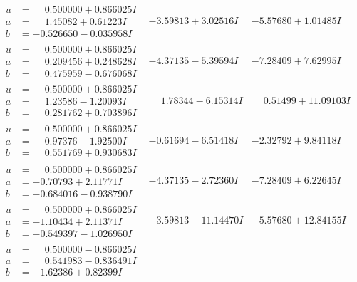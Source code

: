 \documentclass[1p]{elsarticle_modified}
\theoremstyle{definition}
\begin{document}
$$\begin{array}{c|c|c}
\begin{aligned}
u &= \phantom{-}0.500000 + 0.866025 I \\
a &= \phantom{-}1.45082 + 0.61223 I \\
b &= -0.526650 - 0.035958 I\end{aligned}
 & -3.59813 + 3.02516 I & -5.57680 + 1.01485 I \\ \hline\begin{aligned}
u &= \phantom{-}0.500000 + 0.866025 I \\
a &= \phantom{-}0.209456 + 0.248628 I \\
b &= \phantom{-}0.475959 - 0.676068 I\end{aligned}
 & -4.37135 - 5.39594 I & -7.28409 + 7.62995 I \\ \hline\begin{aligned}
u &= \phantom{-}0.500000 + 0.866025 I \\
a &= \phantom{-}1.23586 - 1.20093 I \\
b &= \phantom{-}0.281762 + 0.703896 I\end{aligned}
 & \phantom{-}1.78344 - 6.15314 I & \phantom{-}0.51499 + 11.09103 I \\ \hline\begin{aligned}
u &= \phantom{-}0.500000 + 0.866025 I \\
a &= \phantom{-}0.97376 - 1.92500 I \\
b &= \phantom{-}0.551769 + 0.930683 I\end{aligned}
 & -0.61694 - 6.51418 I & -2.32792 + 9.84118 I \\ \hline\begin{aligned}
u &= \phantom{-}0.500000 + 0.866025 I \\
a &= -0.70793 + 2.11771 I \\
b &= -0.684016 - 0.938790 I\end{aligned}
 & -4.37135 - 2.72360 I & -7.28409 + 6.22645 I \\ \hline\begin{aligned}
u &= \phantom{-}0.500000 + 0.866025 I \\
a &= -1.10434 + 2.11371 I \\
b &= -0.549397 - 1.026950 I\end{aligned}
 & -3.59813 - 11.14470 I & -5.57680 + 12.84155 I \\ \hline\begin{aligned}
u &= \phantom{-}0.500000 - 0.866025 I \\
a &= \phantom{-}0.541983 - 0.836491 I \\
b &= -1.62386 + 0.82399 I\end{aligned}

\end{array}$$
\end{document}
